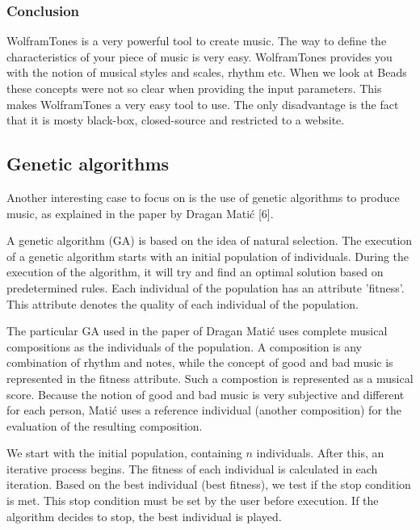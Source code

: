 \documentclass[12pt]{article}
\begin{document}
\subsubsection{Conclusion}

WolframTones is a very powerful tool to create music. The way to define the characteristics of your piece of music is very easy. WolframTones provides you with the notion of musical styles and scales, rhythm etc. When we look at Beads these concepts were not so clear when providing the input parameters. This makes WolframTones a very easy tool to use. The only disadvantage is the fact that it is mosty black-box, closed-source and restricted to a website.

\subsection{Genetic algorithms}

Another interesting case to focus on is the use of genetic algorithms to produce music, as explained in the paper by Dragan Mati\'c [6].
\newline

A genetic algorithm (GA) is based on the idea of natural selection. The execution of a genetic algorithm starts with an initial population of individuals. During the execution of the algorithm, it will try and find an optimal solution based on predetermined rules. Each individual of the population has an attribute 'fitness'. This attribute denotes the quality of each individual of the population.
\newline

The particular GA used in the paper of Dragan Mati\'c uses complete musical compositions as the individuals of the population. A composition is any combination of rhythm and notes, while the concept of good and bad music is represented in the fitness attribute. Such a compostion is represented as a musical score. Because the notion of good and bad music is very subjective and different for each person, Mati\'c uses a reference individual (another composition) for the evaluation of the resulting composition.
\newline

We start with the initial population, containing $n$ individuals. After this, an iterative process begins. The fitness of each individual is calculated in each iteration. Based on the best individual (best fitness), we test if the stop condition is met. This stop condition must be set by the user before execution. If the algorithm decides to stop, the best individual is played.
\newline
\end{document}
